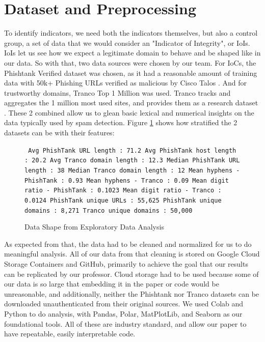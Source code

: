 \documentclass[conference]{IEEEtran}
\begin{document}
\section{Dataset and Preprocessing}
To identify indicators, we need both the indicators themselves, but also a control group, a set of data that we would consider an "Indicator of Integrity", or IoIs.
IoIs let us see how we expect a legitimate domain to behave and be shaped like in our data.
So with that, two data sources were chosen by our team. For IoCs, the Phishtank Verified dataset was chosen, as it had a reasonable amount of training data with 50k+ Phishing URLs verified as malicious by Cisco Talos \cite{phishtank}.
And for trustworthy domains, Tranco Top 1 Million was used. Tranco tracks and aggregates the 1 million most used sites, and provides them as a research dataset \cite{tranco}.
These 2 combined allow us to glean basic lexical and numerical insights on the data typically used by spam detection. Figure \ref{fig:datshape} shows how stratified the 2 datasets can be with their features:

\begin{figure}[H]
\texttt{
Avg PhishTank URL length     : 71.2\newline
Avg PhishTank host length    : 20.2\newline
Avg Tranco domain length     : 12.3\newline
Median PhishTank URL length  : 38\newline
Median Tranco domain length  : 12\newline
Mean hyphens - PhishTank     : 0.93\newline
Mean hyphens - Tranco        : 0.09\newline
Mean digit ratio - PhishTank : 0.1023\newline
Mean digit ratio - Tranco    : 0.0124\newline
PhishTank unique URLs        : 55,625\newline
PhishTank unique domains     : 8,271\newline
Tranco unique domains        : 50,000
}
\centering
\caption{Data Shape from Exploratory Data Analysis}
\label{fig:datshape}
\end{figure}
\clearpage
As expected from that, the data had to be cleaned and normalized for us to do meaningful analysis.
All of our data from that cleaning is stored on Google Cloud Storage Containers and GitHub, primarily to achieve the goal that our results can be replicated by our professor.
Cloud storage had to be used because some of our data is so large that embedding it in the paper or code would be unreasonable, and additionally, neither the Phishtank nor Tranco datasets can be downloaded unauthenticated from their original sources.
We used Colab and Python to do analysis, with Pandas, Polar, MatPlotLib, and Seaborn as our foundational tools. All of these are industry standard, and allow our paper to have repeatable, easily interpretable code. 
\end{document}
